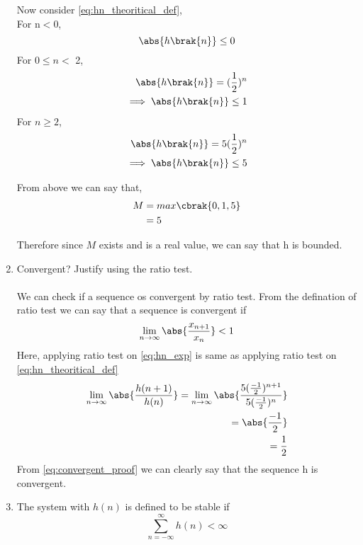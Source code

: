 \documentclass[journal,12pt,twocolumn]{IEEEtran}
\renewcommand\thesection{\arabic{section}}
\begin{document}
\begin{enumerate}[label=\thesection.\arabic*]
Now consider \eqref{eq:hn_theoritical_def},\\
For n$<$0,
\begin{equation}
	\abs{h\brak{n}} \leq 0
\end{equation}
For $0 \leq n <$ 2,
\begin{align}
	\abs{h\brak{n}} = (\frac{1}{2})^n\\
	\implies \abs{h\brak{n}} \leq 1
\end{align}
For $n\geq 2$,
\begin{align}
	\abs{h\brak{n}} = 5(\frac{1}{2})^n\\
	\implies \abs{h\brak{n}} \leq 5
\end{align}

From above we can say that,
      \begin{align}
        M &= max\cbrak{0,1,5} \\
          &= 5\label{eq:hn_bounded_proof}
      \end{align}

Therefore since $M$ exists and is a real value, we can say that h is bounded.
\item Convergent? Justify using the ratio test.\\
\solution\\
We can check if a sequence os convergent by ratio test. From the defination of ratio test we can say that a sequence is convergent if 
\begin{equation}
	\lim_{n \rightarrow \infty}\abs{\frac{x_{n+1}}{x_n}} < 1
\end{equation}
Here, applying ratio test on \eqref{eq:hn_exp} is same as applying ratio test on \eqref{eq:hn_theoritical_def}
\begin{align}
	\lim_{n \rightarrow \infty}\abs{\frac{h(n+1)}{h(n)}} = \lim_{n \rightarrow \infty}\abs{\frac{5(\frac{-1}{2})^{n+1}}{5(\frac{-1}{2})^{n}}}
	\\= \abs{\frac{-1}{2}}
	\\= \frac{1}{2}\label{eq:convergent_proof}
\end{align}
From \eqref{eq:convergent_proof} we can clearly say that the sequence h is convergent.

\item The system with $h(n)$ is defined to be stable if
\begin{equation}
\sum_{n=-\infty}^{\infty}h(n) < \infty
\end{equation}


\end{enumerate}
\end{document}
